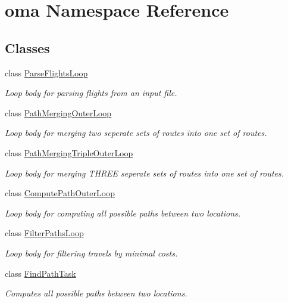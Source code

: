 \hypertarget{namespaceoma}{\section{oma Namespace Reference}
\label{namespaceoma}
}
\subsection*{Classes}
\begin{DoxyCompactItemize}
\item 
class \hyperlink{classoma_1_1_parse_flights_loop}{Parse\-Flights\-Loop}
\begin{DoxyCompactList}\small\item\em Loop body for parsing flights from an input file. \end{DoxyCompactList}\item 
class \hyperlink{classoma_1_1_path_merging_outer_loop}{Path\-Merging\-Outer\-Loop}
\begin{DoxyCompactList}\small\item\em Loop body for merging two seperate sets of routes into one set of routes. \end{DoxyCompactList}\item 
class \hyperlink{classoma_1_1_path_merging_triple_outer_loop}{Path\-Merging\-Triple\-Outer\-Loop}
\begin{DoxyCompactList}\small\item\em Loop body for merging T\-H\-R\-E\-E seperate sets of routes into one set of routes. \end{DoxyCompactList}\item 
class \hyperlink{classoma_1_1_compute_path_outer_loop}{Compute\-Path\-Outer\-Loop}
\begin{DoxyCompactList}\small\item\em Loop body for computing all possible paths between two locations. \end{DoxyCompactList}\item 
class \hyperlink{classoma_1_1_filter_paths_loop}{Filter\-Paths\-Loop}
\begin{DoxyCompactList}\small\item\em Loop body for filtering travels by minimal costs. \end{DoxyCompactList}\item 
class \hyperlink{classoma_1_1_find_path_task}{Find\-Path\-Task}
\begin{DoxyCompactList}\small\item\em Computes all possible paths between two locations. \end{DoxyCompactList}\item 

\end{DoxyCompactItemize}

